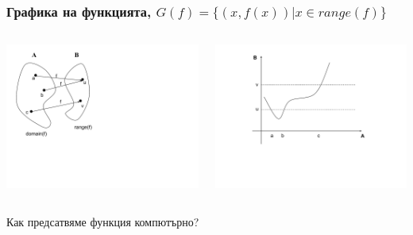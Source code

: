 \documentclass{beamer}
\begin{document}
\begin{frame}[fragile]
\frametitle{Графика на функцията, $G(f)=\{(x,f(x))|x \in range(f)\}$}


\begin{columns}[t]
  \begin{column}{0.4\textwidth}
    \begin{center}
    \includegraphics[width=9.0cm]{images/function_math}
    \end{center}
  \end{column}
  \begin{column}{0.6\textwidth}
    \begin{center}
    \includegraphics[width=9.0cm]{images/function_graph}
    \end{center}

  \end{column}
\end{columns}


\end{frame}

\begin{frame}
\centerline{Как предсатвяме функция компютърно?}
\end{frame}
\end{document}
